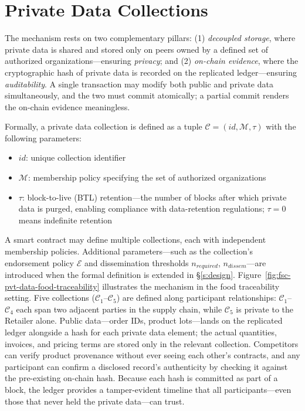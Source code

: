 \section{Private Data Collections}
\label{pdc}
The mechanism rests on two complementary pillars: (1) \textit{decoupled storage}, where private data is shared and stored only on peers owned by a defined set of authorized organizations---ensuring \textit{privacy}; and (2) \textit{on-chain evidence}, where the cryptographic hash of private data is recorded on the replicated ledger---ensuring \textit{auditability}. A single transaction may modify both public and private data simultaneously, and the two must commit atomically; a partial commit renders the on-chain evidence meaningless.

Formally, a private data collection is defined as a tuple $\mathcal{C} = (id, \mathcal{M}, \tau)$ with the following parameters:
\begin{itemize}[topsep=0pt,noitemsep,leftmargin=15pt]
\item $id$: unique collection identifier
\item $\mathcal{M}$: membership policy specifying the set of authorized organizations
\item $\tau$: block-to-live (BTL) retention---the number of blocks after which private data is purged, enabling compliance with data-retention regulations; $\tau = 0$ means indefinite retention
\end{itemize}
A smart contract may define multiple collections, each with independent membership policies. Additional parameters---such as the collection's endorsement policy $\mathcal{E}$ and dissemination thresholds $n_{required}$, $n_{dissem}$---are introduced when the formal definition is extended in \S\ref{s:design}.
Figure~\ref{fig:fsc-pvt-data-food-traceability} illustrates the mechanism in the food traceability setting. Five collections ($\mathcal{C}_1$--$\mathcal{C}_5$) are defined along participant relationships: $\mathcal{C}_1$--$\mathcal{C}_4$ each span two adjacent parties in the supply chain, while $\mathcal{C}_5$ is private to the Retailer alone. Public data---order IDs, product lots---lands on the replicated ledger alongside a hash for each private data element; the actual quantities, invoices, and pricing terms are stored only in the relevant collection. Competitors can verify product provenance without ever seeing each other's contracts, and any participant can confirm a disclosed record's authenticity by checking it against the pre-existing on-chain hash. Because each hash is committed as part of a block, the ledger provides a tamper-evident timeline that all participants---even those that never held the private data---can trust.

